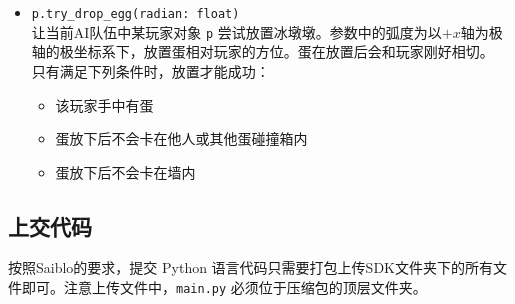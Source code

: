 \documentclass{article}
\begin{document}
\begin{description}
\begin{itemize}
\item
\lstinline{p.try_drop_egg(radian: float)}\\[-2pt]
让当前AI队伍中某玩家对象 \lstinline{p} 尝试放置冰墩墩。参数中的弧度为以$+x$轴为极轴的极坐标系下，放置蛋相对玩家的方位。蛋在放置后会和玩家刚好相切。
只有满足下列条件时，放置才能成功：
	\begin{itemize}\setlength\itemsep{0em}
	\item 该玩家手中有蛋
	\item 蛋放下后不会卡在他人或其他蛋碰撞箱内
	\item 蛋放下后不会卡在墙内
	\end{itemize}
\end{itemize}

\end{description}

\subsection{上交代码}

按照Saiblo的要求，提交 Python 语言代码只需要打包上传SDK文件夹下的所有文件即可。注意上传文件中，\texttt{main.py} 必须位于压缩包的顶层文件夹。
\end{document}

